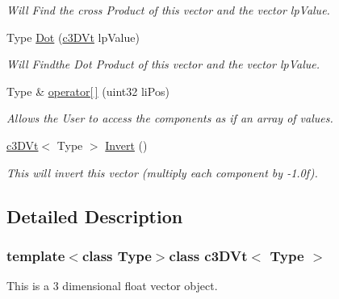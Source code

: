 \begin{DoxyCompactItemize}
\begin{DoxyCompactList}\small\item\em Will Find the cross Product of this vector and the vector lpValue. \end{DoxyCompactList}\item 
\hypertarget{classc3_d_vt_a8868266d3e9f7f711e2afea9982e192c}{
Type \hyperlink{classc3_d_vt_a8868266d3e9f7f711e2afea9982e192c}{Dot} (\hyperlink{classc3_d_vt}{c3DVt} lpValue)}
\label{classc3_d_vt_a8868266d3e9f7f711e2afea9982e192c}

\begin{DoxyCompactList}\small\item\em Will Findthe Dot Product of this vector and the vector lpValue. \end{DoxyCompactList}\item 
\hypertarget{classc3_d_vt_a58fc8999e5128aaa4f9cadab9ddae1f7}{
Type \& \hyperlink{classc3_d_vt_a58fc8999e5128aaa4f9cadab9ddae1f7}{operator\mbox{[}$\,$\mbox{]}} (uint32 liPos)}
\label{classc3_d_vt_a58fc8999e5128aaa4f9cadab9ddae1f7}

\begin{DoxyCompactList}\small\item\em Allows the User to access the components as if an array of values. \end{DoxyCompactList}\item 
\hypertarget{classc3_d_vt_a1dab4d9ea46b5b1632cc8d33a2beda4e}{
\hyperlink{classc3_d_vt}{c3DVt}$<$ Type $>$ \hyperlink{classc3_d_vt_a1dab4d9ea46b5b1632cc8d33a2beda4e}{Invert} ()}
\label{classc3_d_vt_a1dab4d9ea46b5b1632cc8d33a2beda4e}

\begin{DoxyCompactList}\small\item\em This will invert this vector (multiply each component by -\/1.0f). \end{DoxyCompactList}\end{DoxyCompactItemize}


\subsection{Detailed Description}
\subsubsection*{template$<$class Type$>$class c3DVt$<$ Type $>$}

This is a 3 dimensional float vector object. 